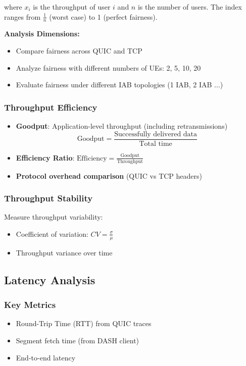 \documentclass[11pt,a4paper]{article}
\begin{document}
where $x_i$ is the throughput of user $i$ and $n$ is the number of users. The index ranges from $\frac{1}{n}$ (worst case) to 1 (perfect fairness).

\textbf{Analysis Dimensions:}
\begin{itemize}
    \item Compare fairness across QUIC and TCP
    \item Analyze fairness with different numbers of UEs: 2, 5, 10, 20
    \item Evaluate fairness under different IAB topologies (1 IAB, 2 IAB ...)
\end{itemize}

\subsubsection{Throughput Efficiency}
\begin{itemize}
    \item \textbf{Goodput}: Application-level throughput (including retransmissions)
        \begin{equation}
            \text{Goodput} = \frac{\text{Successfully delivered data}}{\text{Total time}}
        \end{equation}
    \item \textbf{Efficiency Ratio}: $\text{Efficiency} = \frac{\text{Goodput}}{\text{Throughput}}$
    \item \textbf{Protocol overhead comparison} (QUIC vs TCP headers)
\end{itemize}

\subsubsection{Throughput Stability}
Measure throughput variability:
\begin{itemize}
    \item Coefficient of variation: $CV = \frac{\sigma}{\mu}$
    \item Throughput variance over time
\end{itemize}

\subsection{Latency Analysis}

\subsubsection{Key Metrics}
\begin{itemize}
    \item Round-Trip Time (RTT) from QUIC traces
    \item Segment fetch time (from DASH client)
    \item End-to-end latency
\end{itemize}
\end{document}

